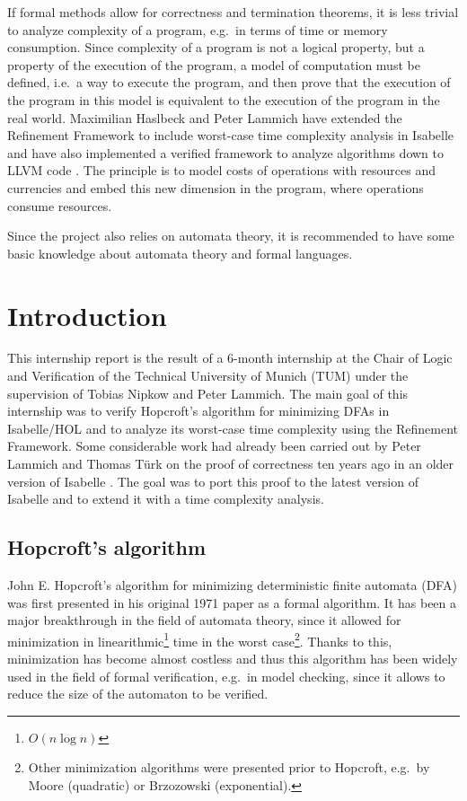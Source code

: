 \documentclass[12pt, a4 paper]{article}
\theoremstyle{definition}
\begin{document}
\bigskip

If formal methods allow for correctness and termination theorems, it is less trivial to analyze complexity of a program, e.g.\ in terms of time or memory consumption.
Since complexity of a program is not a logical property, but a property of the execution of the program, a model of computation must be defined, i.e.\ a way to execute the program, and then prove that the execution of the program in this model is equivalent to the execution of the program in the real world.
Maximilian Haslbeck and Peter Lammich have extended the Refinement Framework to include worst-case time complexity analysis in Isabelle \cite{refwithtime} and have also implemented a verified framework to analyze algorithms down to LLVM code \cite{fewdollarsmore}.
The principle is to model costs of operations with resources and currencies and embed this new dimension in the program, where operations consume resources.

\bigskip

Since the project also relies on automata theory, it is recommended to have some basic knowledge about automata theory and formal languages.

\section{Introduction}

This internship report is the result of a 6-month internship at the Chair of Logic and Verification of the Technical University of Munich (TUM) under the supervision of Tobias Nipkow and Peter Lammich.
The main goal of this internship was to verify Hopcroft's algorithm for minimizing DFAs in Isabelle/HOL and to analyze its worst-case time complexity using the Refinement Framework.
Some considerable work had already been carried out by Peter Lammich and Thomas T\"urk on the proof of correctness ten years ago in an older version of Isabelle \cite{lammich:hop}.
The goal was to port this proof to the latest version of Isabelle and to extend it with a time complexity analysis.

\subsection{Hopcroft's algorithm}
John E. Hopcroft's algorithm for minimizing deterministic finite automata (DFA) was first presented in his original 1971 paper \cite{Hop71} as a formal algorithm.
It has been a major breakthrough in the field of automata theory, since it allowed for minimization in linearithmic\footnote{$O(n \log n)$} time in the worst case\footnote{Other minimization algorithms were presented prior to Hopcroft, e.g.\ by Moore (quadratic) or Brzozowski (exponential).}.
Thanks to this, minimization has become almost costless and thus this algorithm has been widely used in the field of formal verification, e.g.\ in model checking, since it allows to reduce the size of the automaton to be verified.
\end{document}
